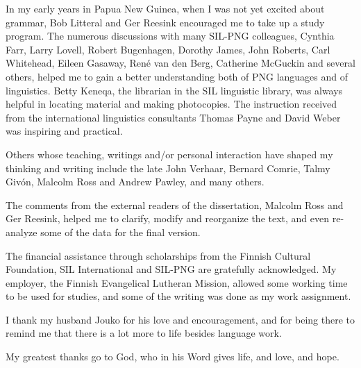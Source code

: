 In my early years in Papua New Guinea, when I was not yet excited about grammar,  Bob Litteral and Ger Reesink encouraged me to take up a study program. The numerous discussions with many SIL-PNG colleagues, Cynthia Farr, Larry Lovell, Robert Bugenhagen, Dorothy James, John Roberts, Carl Whitehead, Eileen Gasaway, Ren\'e van den Berg, Catherine McGuckin and several others, helped me to gain a better understanding both of  PNG languages and of linguistics. Betty Keneqa, the librarian in the SIL linguistic library, was always helpful in locating material and making photocopies. The instruction received from the international linguistics consultants Thomas Payne and David Weber was inspiring and practical.

Others whose teaching, writings and/or personal interaction have shaped my thinking and writing include the late John Verhaar, Bernard Comrie, Talmy Giv\'on, Malcolm Ross and Andrew Pawley, and many others.  

The comments from the external readers of the dissertation, Malcolm Ross and Ger Reesink, helped me to clarify, modify and reorganize the text, and even re-analyze some of the data for the final version.

The financial assistance through scholarships from the Finnish Cultural Foundation, SIL International and SIL-PNG are gratefully acknowledged. My employer, the Finnish Evangelical Lutheran Mission, allowed some working time to be used for studies, and some of the writing was done as my work assignment. 

I thank my husband Jouko for his love and encouragement, and for being there to remind me that there is a lot more to life besides language work.

My greatest thanks go to God, who in his Word gives life, and love, and hope.